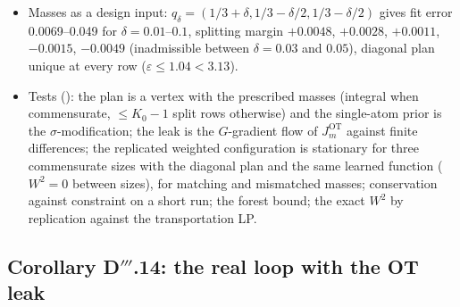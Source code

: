 \begin{itemize}
    nearest atom; against $\nu$ (the mean-field stationary measure): $W^2(\mu_m,\nu)=1.21$, $0.33$, $0.079$,
    $0.038$, $m\cdot W^2=19.4$--$21.0$ (slope $-0.98\pm0.03$), fit error $0.028$, $0.0093$, $0.0023$, $0.0011$,
    $m\cdot\mathrm{fit}=0.45$--$0.60$ (squared slope $-1.81\pm0.05$); against the $M=512$ reference (two bridge
    particles of its own) OT $3.4\cdot10^{-4}$, $3.1\cdot10^{-5}$, $1.1\cdot10^{-6}$ (function level; $m=16$ still
    relaxing, plateau $2.8\cdot10^{-4}$ in round 11's continued run) and $1.16$, $0.29$, $0.041$ ($W^2$) vs nearest
    $2.5\cdot10^{-3}$, $5.0\cdot10^{-4}$, $4.4\cdot10^{-5}$ and $4.8$, $2.7$, $0.69$; nearest fit errors $0.061$,
    $0.035$, $0.013$, $0.012$.
  \item Masses as a design input: $q_\delta=(1/3+\delta,1/3-\delta/2,1/3-\delta/2)$ gives fit error 0.0069--0.049
    for $\delta=0.01$--$0.1$, splitting margin $+0.0048$, $+0.0028$, $+0.0011$, $-0.0015$, $-0.0049$ (inadmissible
    between $\delta=0.03$ and $0.05$), diagonal plan unique at every row ($\varepsilon\le1.04<3.13$).
  \item Tests (): the plan is a vertex with the prescribed masses (integral when
    commensurate, $\le K_0-1$ split rows otherwise) and the single-atom prior is the $\sigma$-modification; the leak
    is the $G$-gradient flow of $J_m^{\mathrm{OT}}$ against finite differences; the replicated weighted
    configuration is stationary for three commensurate sizes with the diagonal plan and the same learned function
    ($W^2=0$ between sizes), for matching and mismatched masses; conservation against constraint on a short run; the
    forest bound; the exact $W^2$ by replication against the transportation LP.
\end{itemize}

\subsection{Corollary D\texorpdfstring{$'''$}{'''}.14: the real loop with the OT leak}

